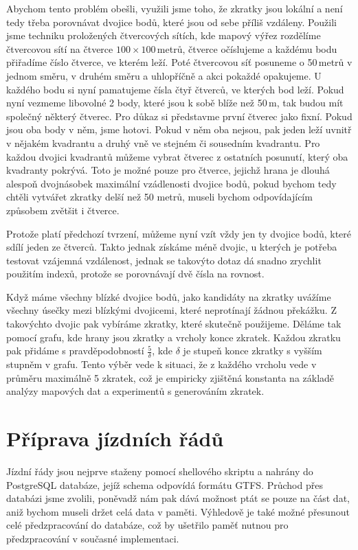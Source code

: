 Abychom tento problém obešli, využili jsme toho, že zkratky jsou lokální a není
tedy třeba porovnávat dvojice bodů, které jsou od sebe příliš vzdáleny. Použili
jsme techniku proložených čtvercových sítích, kde mapový výřez rozdělíme
čtvercovou sítí na čtverce $100\times100$\,metrů, čtverce očíslujeme a každému
bodu přiřadíme číslo čtverce, ve kterém leží. Poté čtvercovou síť posuneme o
50\,metrů v jednom směru, v druhém směru a uhlopříčně a akci pokaždé opakujeme.
U každého bodu si nyní pamatujeme čísla čtyř čtverců, ve kterých bod leží. 
Pokud nyní vezmeme libovolné 2 body, které jsou k sobě blíže než 50\,m, tak
budou mít společný některý čtverec. Pro důkaz si představme první čtverec jako
fixní. Pokud jsou oba body v něm, jsme hotovi. Pokud v něm oba nejsou, pak jeden
leží uvnitř v nějakém kvadrantu a druhý vně ve stejném či sousedním kvadrantu.
Pro každou dvojici kvadrantů můžeme vybrat čtverec z ostatních posunutí, který
oba kvadranty pokrývá. Toto je možné pouze pro čtverce, jejichž hrana je dlouhá
alespoň dvojnásobek maximální vzádlenosti dvojice bodů, pokud bychom tedy chtěli
vytvářet zkratky delší než 50 metrů, museli bychom odpovídajícím způsobem
zvětšit i čtverce.

Protože platí předchozí tvrzení, můžeme nyní vzít vždy jen ty dvojice bodů,
které sdílí jeden ze čtverců. Takto jednak získáme méně dvojic, u kterých je
potřeba testovat vzájemná vzdálenost, jednak se takovýto dotaz dá snadno
zrychlit použitím indexů, protože se porovnávají dvě čísla na rovnost. 

Když máme všechny blízké dvojice bodů, jako kandidáty na zkratky uvážíme
všechny úsečky mezi blízkými dvojicemi, které neprotínají žádnou překážku. Z
takovýchto dvojic pak vybíráme zkratky, které skutečně použijeme. Děláme
tak pomocí grafu, kde hrany jsou zkratky a vrcholy konce zkratek. Každou zkratku
pak přidáme s pravděpodobností $\frac{5}{\delta}$, kde $\delta$ je stupeň konce
zkratky s vyšším stupněm v grafu. Tento výběr vede k situaci, že z každého
vrcholu vede v průměru maximálně 5 zkratek, což je empiricky zjištěná konstanta
na základě analýzy mapových dat a experimentů s generováním zkratek.

\section{Příprava jízdních řádů}
\label{ch:implementace:GTFS}
Jízdní řády jsou nejprve staženy pomocí shellového skriptu a nahrány do
PostgreSQL databáze, jejíž schema odpovídá formátu GTFS. Průchod přes databázi
jsme zvolili, poněvadž nám pak dává možnost ptát se pouze na část dat,
aniž bychom museli držet celá data v paměti. Výhledově je také možné přesunout
celé předzpracování do databáze, což by ušetřilo paměť nutnou pro předzpracování
v současné implementaci.

